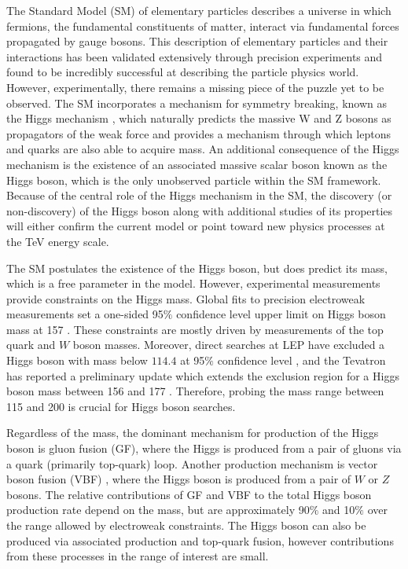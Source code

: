 The Standard Model (SM) of elementary particles describes a universe in which fermions, the fundamental 
constituents of  matter, interact via fundamental forces propagated by gauge bosons. This description of elementary
particles and their interactions has been validated extensively through precision experiments and found to be incredibly
successful at describing the particle physics world. However, experimentally, there remains a missing piece of the
puzzle yet to be observed.  The SM incorporates a mechanism for symmetry breaking, known as the Higgs mechanism 
\cite{ref:HiggsMechanism,ref:HiggsMechanism1}, which naturally predicts the massive W and Z bosons as propagators of the weak 
force and provides a mechanism through which leptons and quarks are also able to acquire mass. An additional consequence of 
the Higgs mechanism is the existence of an associated massive scalar boson known as the Higgs boson, which is the only unobserved particle within
the SM framework.  Because of the central role of the Higgs mechanism in the SM, the discovery (or non-discovery) of the
Higgs boson along with additional studies of its properties will either confirm the current model or point toward new physics 
processes at the TeV energy scale.

The SM postulates the existence of the Higgs boson, but does predict its mass, which is a free parameter in the model. 
However, experimental measurements provide constraints on the Higgs mass.  Global fits to precision electroweak measurements 
set a one-sided 95$\%$ confidence level upper limit on Higgs boson mass at 157 \GeVcc \cite{ref:GlobalEwkConstraints}.
These constraints are mostly driven by measurements of the top quark and $W$ boson masses. Moreover, direct searches
at LEP have excluded a Higgs boson with mass below $114.4$ \GeVcc at 95$\%$ confidence level \cite{ref:LepExclusion}, and the Tevatron
has reported a preliminary update which extends the exclusion region for a Higgs boson mass between 156 and 177 \GeVcc \cite{ref:TevExclusion}.
Therefore, probing the mass range between 115 and 200 \GeVcc is crucial for Higgs boson searches.

Regardless of the mass, the dominant mechanism for production of the Higgs boson is gluon fusion (GF)\cite{ref:GF1,ref:GF2}, where the Higgs
is produced from a pair of gluons via a quark (primarily top-quark) loop. Another production mechanism is vector boson 
fusion (VBF) \cite{ref:VBF}, where the Higgs boson is produced from a pair of $W$ or $Z$ bosons. The relative contributions of GF and VBF
to the total Higgs boson production rate depend on the mass, but are approximately 90$\%$ and 10$\%$ over the range allowed
by electroweak constraints.  The Higgs boson can also be produced via associated production \cite{ref:VH1,ref:VH2} and top-quark fusion, however
contributions from these processes in the range of interest are small.

